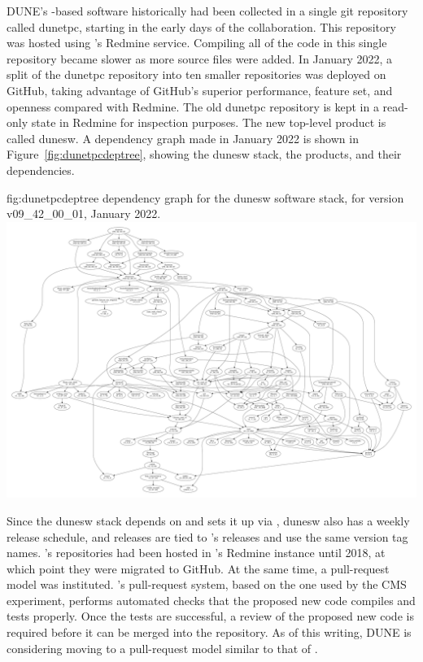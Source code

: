 \documentclass[../main-v1.tex]{subfiles}
\begin{document}
DUNE's -based software historically had been collected in a single git repository called dunetpc, starting in the early days of the collaboration.  This repository was hosted using 's Redmine service.  Compiling all of the code in this single repository became slower as more source files were added.  In January 2022, a split of the dunetpc repository into ten smaller repositories was deployed on GitHub, taking advantage of GitHub's superior performance, feature set, and openness compared with Redmine.  The old dunetpc repository is kept in a read-only state in Redmine for inspection purposes.  The new top-level product is called dunesw.  A  dependency graph made in January 2022 is shown in Figure~\ref{fig:dunetpcdeptree}, showing the dunesw stack, the   products, and their dependencies.

\begin{dunefigure}
{fig:dunetpcdeptree}
{ dependency graph for the dunesw software stack, for version v09\_42\_00\_01, January 2022.}
\includegraphics[width=\textwidth]{graphics/CodeManagementFigures/dunesw_v09_42_00_01_graph.pdf}
\end{dunefigure}

Since the dunesw stack depends on  and sets it up via , dunesw also has a weekly release schedule, and releases are tied to 's releases and use the same version tag names.  's repositories had been hosted in 's Redmine instance until 2018, at which point they were migrated to GitHub.  At the same time, a pull-request model was instituted.  's pull-request system, based on the one used by the CMS experiment, performs automated checks that the proposed new code compiles and tests properly.  Once the tests are successful, a review of the proposed new code is required before it can be merged into the repository.  As of this writing, DUNE is considering moving to a pull-request model similar to that of .
\end{document}

